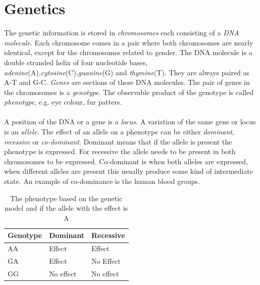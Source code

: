 \documentclass[10pt,a4paper]{report}
\begin{document}
\section{Genetics}
The genetic information is stored in \emph{chromosomes} each consisting of a \emph{DNA molecule}\cite{sadava_life}. Each chromosome comes in a pair where both chromosomes are nearly identical, except for the chromosomes related to gender\cite{sadava_life}. The DNA molecule is a double stranded helix of four nucleotide bases, \emph{adenine}(A),\emph{cytosine}(C),\emph{guanine}(G) and \emph{thymine}(T). They are always paired as A-T and G-C. \emph{Genes} are sections of these DNA molecules. The pair of genes in the chromosomes is a \emph{genotype}. The observable product of the genotype is called \emph{phenotype}, e.g. eye colour, fur patters.\\
\\
A position of the DNA or a gene is a \emph{locus}\cite{sadava_life}. A variation of the same gene or locus is an \emph{allele}\cite{sadava_life}. The effect of an allele on a phenotype can be either \emph{dominant}, \emph{recessive} or \emph{co-dominant}. Dominant means that if the allele is present the phenotype is expressed. For recessive the allele needs to be present in both chromosomes to be expressed\cite{sadava_life}. Co-dominant is when both alleles are expressed, when different alleles are present this usually produce some kind of intermediate state\cite{sadava_life}. An example of co-dominance is the human blood groups\cite{sadava_life}.

\begin{table}[h]
\begin{tabular}{| l l l |}
  \hline
  Genotype & Dominant & Recessive\\
  \hline
  AA & Effect & Effect \\
  GA & Effect & No Effect \\
  GG & No effect & No effect \\
  \hline  
\end{tabular}
\caption{The phenotype based on the genetic model and if the  allele with the effect is A}
\label{table:genetic}
\end{table}
\end{document}
